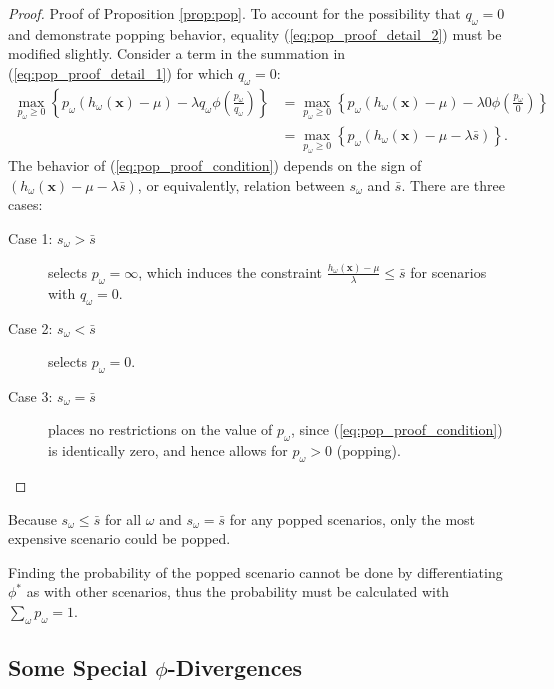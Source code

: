 \documentclass[opre,nonblindrev]{informs3} %
\newcommand{\x}{\mathbf{x}}
\begin{document}
\begin{proof}{\sc Proof of Proposition \ref{prop:pop}.}
	To account for the possibility that $q_\omega = 0$ and demonstrate popping behavior, equality (\ref{eq:pop_proof_detail_2}) must be modified slightly.
	Consider a term in the summation in (\ref{eq:pop_proof_detail_1}) for which $q_\omega = 0$:
	\begin{align}
		\max_{p_\omega \geq 0} \left\{ p_\omega (h_\omega(\x) - \mu) - \lambda q_\omega  \phi\left(\frac{p_\omega}{q_\omega}\right) \right\} & = \max_{p_\omega \geq 0} \left\{ p_\omega (h_\omega(\x) - \mu) - \lambda 0  \phi\left(\frac{p_\omega}{0}\right) \right\} \nonumber \\
		& = \max_{p_\omega \geq 0} \left\{ p_\omega \left( h_\omega(\x) - \mu - \lambda \bar{s} \right) \right\}. \label{eq:pop_proof_condition}
	\end{align}
	The behavior of (\ref{eq:pop_proof_condition}) depends on the sign of $\left( h_\omega(\x) - \mu - \lambda \bar{s}  \right)$, or equivalently, relation between $s_\omega$ and $\bar{s}$.
	There are three cases:
	\begin{description}
		\item[Case 1: $s_\omega > \bar{s}$] selects $p_\omega = \infty$, which induces the constraint $\frac{h_\omega(\x) - \mu}{\lambda} \leq \bar{s}$ for scenarios with $q_\omega = 0$.
		\item[Case 2: $s_\omega < \bar{s}$] selects $p_\omega = 0$.
		\item[Case 3: $s_\omega = \bar{s}$] places no restrictions on the value of $p_\omega$, since (\ref{eq:pop_proof_condition}) is identically zero, and hence allows for $p_\omega > 0$ (popping). \Halmos %
	\end{description}
\end{proof}

\begin{remark}
	Because $s_\omega \leq \bar{s}$ for all $\omega$ and $s_\omega = \bar{s}$ for any popped scenarios, only the most expensive scenario could be popped.
\end{remark}

\begin{remark}
	Finding the probability of the popped scenario cannot be done by differentiating $\phi^*$ as with other scenarios, thus the probability must be calculated with $\sum_\omega p_\omega = 1$.
\end{remark}

\subsection{Some Special $\phi$-Divergences}
\label{ssec:special_phi}
\end{document}
